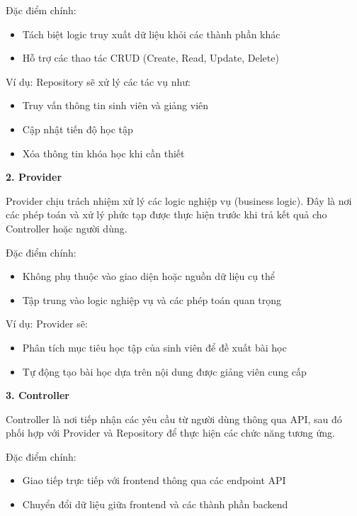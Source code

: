 Đặc điểm chính:

\begin{itemize}
    \item Tách biệt logic truy xuất dữ liệu khỏi các thành phần khác
    \item Hỗ trợ các thao tác CRUD (Create, Read, Update, Delete)
\end{itemize}

Ví dụ: Repository sẽ xử lý các tác vụ như:

\begin{itemize}
    \item Truy vấn thông tin sinh viên và giảng viên
    \item Cập nhật tiến độ học tập
    \item Xóa thông tin khóa học khi cần thiết
\end{itemize}

\textbf{2. Provider} 

Provider chịu trách nhiệm xử lý các logic nghiệp vụ (business logic). Đây là nơi các phép toán và xử lý phức tạp được thực hiện trước khi trả kết quả cho Controller hoặc người dùng.

Đặc điểm chính:

\begin{itemize}
    \item Không phụ thuộc vào giao diện hoặc nguồn dữ liệu cụ thể
    \item Tập trung vào logic nghiệp vụ và các phép toán quan trọng
\end{itemize}

Ví dụ: Provider sẽ:

\begin{itemize}
    \item Phân tích mục tiêu học tập của sinh viên để đề xuất bài học
    \item Tự động tạo bài học dựa trên nội dung được giảng viên cung cấp
\end{itemize}
 
\textbf{3. Controller} 

Controller là nơi tiếp nhận các yêu cầu từ người dùng thông qua API, sau đó phối hợp với Provider và Repository để thực hiện các chức năng tương ứng.

Đặc điểm chính:

\begin{itemize}
    \item Giao tiếp trực tiếp với frontend thông qua các endpoint API
    \item Chuyển đổi dữ liệu giữa frontend và các thành phần backend
\end{itemize}

